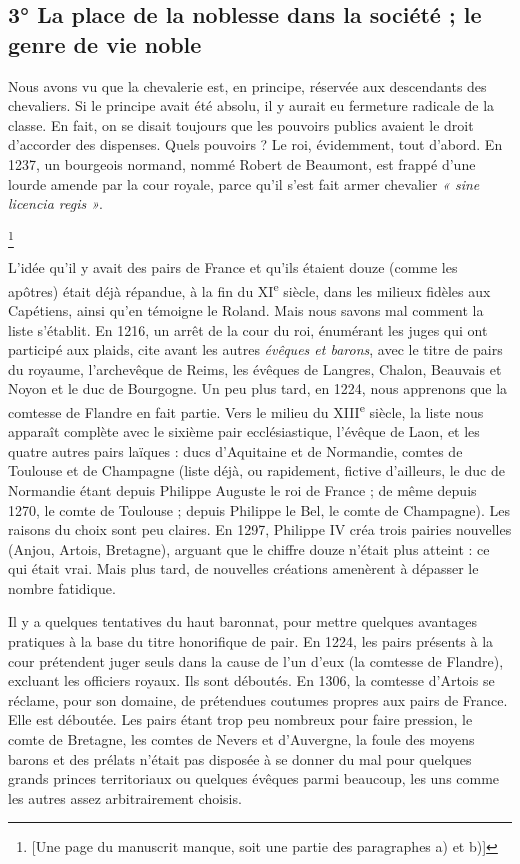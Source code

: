 \documentclass[french,twoside]{book} %
\newcommand{\labelchar}[1]{{\color{rubric}\bf #1}}
\begin{document}
\subsection[3° La place de la noblesse dans la société ; le genre de vie noble]{3° La place de la noblesse dans la société ; le genre de vie noble}
\noindent \labelchar{a) Comment la classe reste ouverte ?}\par
Nous avons vu que la chevalerie est, en principe, réservée aux descendants des chevaliers. Si le principe avait été absolu, il y aurait eu fermeture radicale de la classe. En fait, on se disait toujours que les pouvoirs publics avaient le droit d’accorder des dispenses. Quels pouvoirs ? Le roi, évidemment, tout d’abord. En 1237, un bourgeois normand, nommé Robert de Beaumont, est frappé d’une lourde amende par la cour royale, parce qu’il s’est fait armer chevalier \emph{« sine licencia regis »}.\par
[…] \footnote{[Une page du manuscrit manque, soit une partie des paragraphes a) et b)]}\par
\label{p68} L’idée qu’il y avait des pairs de France et qu’ils étaient douze (comme les apôtres) était déjà répandue, à la fin du XI\textsuperscript{e} siècle, dans les milieux fidèles aux Capétiens, ainsi qu’en témoigne le Roland. Mais nous savons mal comment la liste s’établit. En 1216, un arrêt de la cour du roi, énumérant les juges qui ont participé aux plaids, cite avant les autres \emph{évêques et barons}, avec le titre de pairs du royaume, l’archevêque de Reims, les évêques de Langres, Chalon, Beauvais et Noyon et le duc de Bourgogne. Un peu plus tard, en 1224, nous apprenons que la comtesse de Flandre en fait partie. Vers le milieu du XIII\textsuperscript{e} siècle, la liste nous apparaît complète avec le sixième pair ecclésiastique, l’évêque de Laon, et les quatre autres pairs laïques : ducs d’Aquitaine et de Normandie, comtes de Toulouse et de Champagne (liste déjà, ou rapidement, fictive d’ailleurs, le duc de Normandie étant depuis Philippe Auguste le roi de France ; de même depuis 1270, le comte de Toulouse ; depuis Philippe le Bel, le comte de Champagne). Les raisons du choix sont peu claires. En 1297, Philippe IV créa trois pairies nouvelles (Anjou, Artois, Bretagne), arguant que le chiffre douze n’était plus atteint : ce qui était vrai. Mais plus tard, de nouvelles créations amenèrent à dépasser le nombre fatidique.\par
Il y a quelques tentatives du haut baronnat, pour mettre quelques avantages pratiques à la base du titre honorifique de pair. En 1224, les pairs présents à la cour prétendent juger seuls dans la cause de l’un d’eux (la comtesse de Flandre), excluant les officiers royaux. Ils sont déboutés. En 1306, la comtesse d’Artois se réclame, pour son domaine, de prétendues coutumes propres aux pairs de France. Elle est déboutée. Les pairs étant trop peu nombreux pour faire pression, le comte de Bretagne, les comtes de Nevers et d’Auvergne, la foule des moyens barons et des prélats n’était pas disposée à se donner du mal pour quelques grands princes territoriaux ou quelques évêques parmi beaucoup, les uns comme les autres assez arbitrairement choisis.\par
\end{document}
